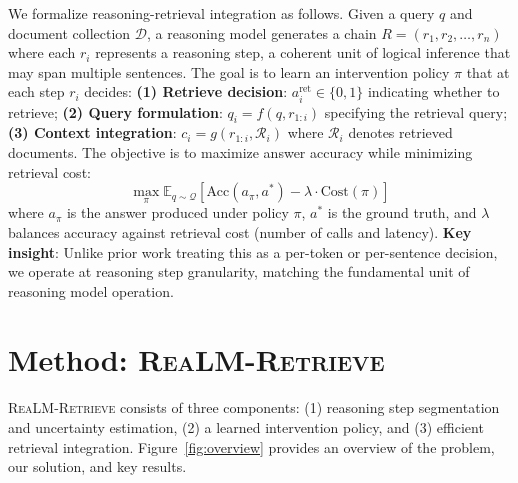 \documentclass[sigconf,natbib=true]{acmart}
\newcommand{\methodname}{\textsc{ReaLM-Retrieve}}
\begin{document}
We formalize reasoning-retrieval integration as follows. Given a query $q$ and document collection $\mathcal{D}$, a reasoning model generates a chain $R = (r_1, r_2, \ldots, r_n)$ where each $r_i$ represents a reasoning step, a coherent unit of logical inference that may span multiple sentences. The goal is to learn an intervention policy $\pi$ that at each step $r_i$ decides: \textbf{(1) Retrieve decision}: $a^{\text{ret}}_i \in \{0, 1\}$ indicating whether to retrieve; \textbf{(2) Query formulation}: $q_i = f(q, r_{1:i})$ specifying the retrieval query; \textbf{(3) Context integration}: $c_i = g(r_{1:i}, \mathcal{R}_i)$ where $\mathcal{R}_i$ denotes retrieved documents. The objective is to maximize answer accuracy while minimizing retrieval cost:
\begin{equation}
\max_{\pi} \mathbb{E}_{q \sim \mathcal{Q}} [\text{Acc}(a_\pi, a^*) - \lambda \cdot \text{Cost}(\pi)]
\label{eq:objective}
\end{equation}
where $a_\pi$ is the answer produced under policy $\pi$, $a^*$ is the ground truth, and $\lambda$ balances accuracy against retrieval cost (number of calls and latency). \textbf{Key insight}: Unlike prior work treating this as a per-token or per-sentence decision, we operate at reasoning step granularity, matching the fundamental unit of reasoning model operation.

\section{Method: \methodname{}}
\label{sec:method}

\methodname{} consists of three components: (1) reasoning step segmentation and uncertainty estimation, (2) a learned intervention policy, and (3) efficient retrieval integration. Figure~\ref{fig:overview} provides an overview of the problem, our solution, and key results.
\end{document}
